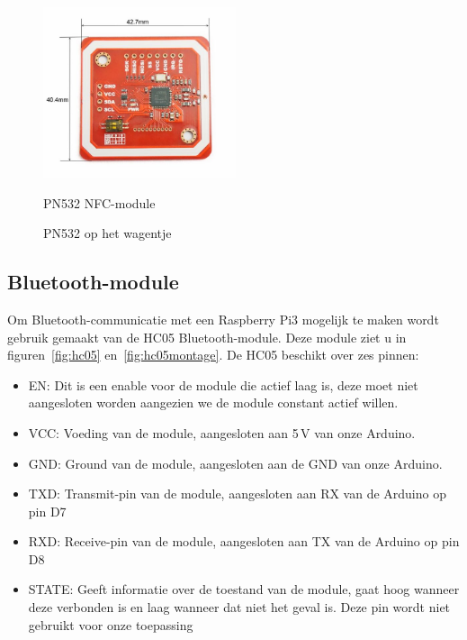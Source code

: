\begin{figure}[H]
	\centering
	\begin{minipage}[b]{0.4\textwidth}
		\centering
		\includegraphics[height=5cm]{rfidlezer.png}
		\caption{PN532 NFC-module\label{fig:pn532}}
	\end{minipage}
	\hfill
	\begin{minipage}[b]{0.4\textwidth}
		\centering
		\caption{PN532 op het wagentje\label{fig:rfidlezermontage}}
	\end{minipage}
\end{figure}
\subsection{Bluetooth-module}
Om Bluetooth-communicatie met een Raspberry Pi3 mogelijk te maken wordt gebruik gemaakt van de HC05 Bluetooth-module. Deze module ziet u in figuren~\ref{fig:hc05} en~\ref{fig:hc05montage}. De HC05 beschikt over zes pinnen:
\begin{itemize}
	\item EN: Dit is een enable voor de module die actief laag is, deze moet niet aangesloten worden aangezien we de module constant actief willen.
	\item VCC: Voeding van de module, aangesloten aan 5\,V van onze Arduino.
	\item GND: Ground van de module, aangesloten aan de GND van onze Arduino.
	\item TXD: Transmit-pin van de module, aangesloten aan RX van de Arduino op pin D7
	\item RXD: Receive-pin van de module, aangesloten aan TX van de Arduino op pin D8
	\item STATE: Geeft informatie over de toestand van de module, gaat hoog wanneer deze verbonden is en laag wanneer dat niet het geval is. Deze pin wordt niet gebruikt voor onze toepassing
\end{itemize}

